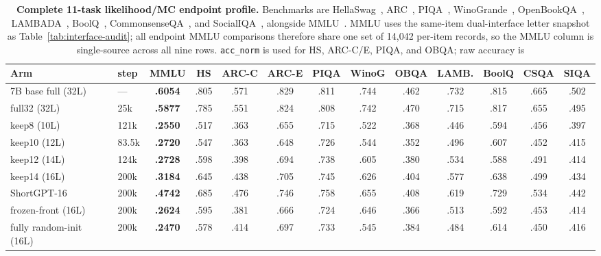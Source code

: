 \begin{table}[t]
\centering
\scriptsize
\setlength{\tabcolsep}{2.2pt}
\begin{tabular}{@{}llccccccccccc@{}}
\toprule
\textbf{Arm} & \textbf{step} & \textbf{MMLU} & \textbf{HS} &
\textbf{ARC-C} & \textbf{ARC-E} & \textbf{PIQA} & \textbf{WinoG} &
\textbf{OBQA} & \textbf{LAMB.} & \textbf{BoolQ} & \textbf{CSQA} &
\textbf{SIQA} \\
\midrule
7B base full (32L)       & ---    & \textbf{.6054} & .805 & .571 & .829 & .811 & .744 & .462 & .732 & .815 & .665 & .502 \\
full32 (32L)             & 25k & \textbf{.5877} & .785 & .551 & .824 & .808 & .742 & .470 & .715 & .817 & .655 & .495 \\
keep8 (10L)              & 121k & \textbf{.2550} & .517 & .363 & .655 & .715 & .522 & .368 & .446 & .594 & .456 & .397 \\
keep10 (12L)             & 83.5k & \textbf{.2720} & .547 & .363 & .648 & .726 & .544 & .352 & .496 & .607 & .452 & .415 \\
keep12 (14L)             & 124k & \textbf{.2728} & .598 & .398 & .694 & .738 & .605 & .380 & .534 & .588 & .491 & .414 \\
keep14 (16L)             & 200k & \textbf{.3184} & .645 & .438 & .705 & .745 & .626 & .404 & .577 & .638 & .499 & .434 \\
ShortGPT-16              & 200k & \textbf{.4742} & .685 & .476 & .746 & .758 & .655 & .408 & .619 & .729 & .534 & .442 \\
frozen-front (16L)       & 200k & \textbf{.2624} & .595 & .381 & .666 & .724 & .646 & .366 & .513 & .592 & .453 & .414 \\
fully random-init (16L)  & 200k & \textbf{.2470} & .578 & .414 & .697 & .733 & .545 & .384 & .484 & .614 & .450 & .416 \\
\bottomrule
\end{tabular}
\caption{\textbf{Complete 11-task likelihood/MC endpoint profile.}
Benchmarks are HellaSwag~\citep{hellaswag}, ARC~\citep{arc},
PIQA~\citep{piqa}, WinoGrande~\citep{winogrande},
OpenBookQA~\citep{openbookqa}, LAMBADA~\citep{lambada},
BoolQ~\citep{boolq}, CommonsenseQA~\citep{commonsenseqa}, and
SocialIQA~\citep{socialiqa}, alongside MMLU~\citep{hendrycks2021mmlu}.
MMLU uses the same-item dual-interface letter snapshot as Table~\ref{tab:interface-audit}; all endpoint MMLU comparisons therefore share one set of 14,042 per-item records, so the MMLU column is single-source across all nine rows.
\texttt{acc\_norm} is used for HS, ARC-C/E, PIQA, and OBQA; raw accuracy is
}
\end{table}
